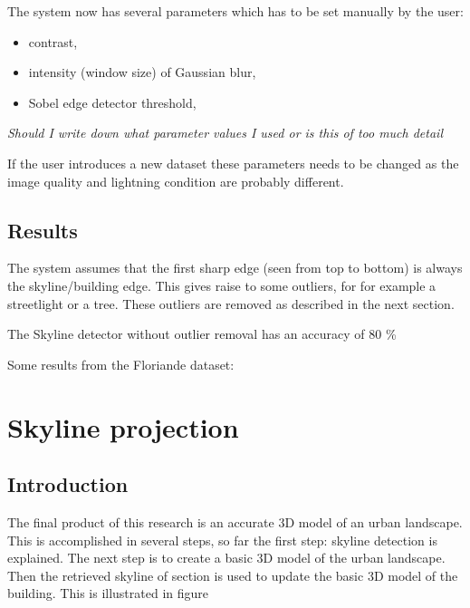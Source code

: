 \documentclass[10pt]{article}
\begin{document}
The system now has several parameters which has to be set manually by the user:
\begin{itemize}
	\item contrast,
	\item intensity (window size) of Gaussian blur,
	\item Sobel edge detector threshold,
\end{itemize}
\textit{Should I write down what parameter values I used or is this of too much
detail}

If the user introduces a new dataset these parameters needs to be changed
as the image quality and lightning condition are probably different.

 \subsection{Results}%
The system assumes that the first sharp edge (seen from top to bottom) is
always the skyline/building edge. This gives raise to some outliers, for 
for example a streetlight or a tree. These outliers are removed as described in
the next section.  

The Skyline detector without outlier removal has an accuracy of 80 \% 

Some results from the Floriande dataset:






\section{Skyline projection}
 \subsection{Introduction}
The final product of this research is an accurate 3D model of an urban
landscape. This is accomplished in several steps, so far the first step: skyline detection is
explained. The next step is to create a basic 3D model of the urban landscape.
Then the retrieved skyline of section %
is used to update the basic 3D model of the building. This is illustrated in
figure 
\end{document}

